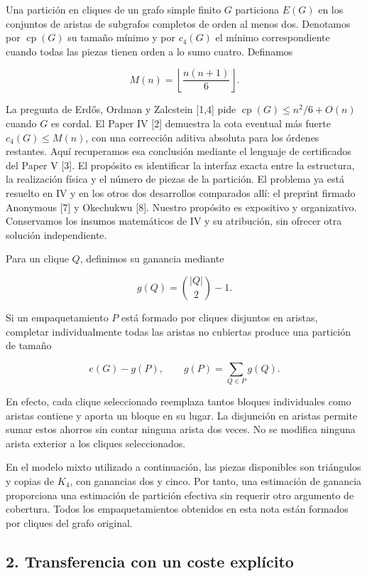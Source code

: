 \documentclass[spanish,11pt,a4paper]{article}
\begin{document}
Una partición en cliques de un grafo simple finito \(G\) particiona
\(E(G)\) en los conjuntos de aristas de subgrafos completos de orden al
menos dos. Denotamos por \(\operatorname{cp}(G)\) su tamaño mínimo y por
\(c_4(G)\) el mínimo correspondiente cuando todas las piezas tienen
orden a lo sumo cuatro. Definamos

\[
M(n)=\left\lfloor\frac{n(n+1)}6\right\rfloor.
\tag{1.1}
\]

La pregunta de Erdős, Ordman y Zalcstein {[}1,4{]} pide
\(\operatorname{cp}(G)\le n^2/6+O(n)\) cuando \(G\) es cordal. El Paper
IV {[}2{]} demuestra la cota eventual más fuerte \(c_4(G)\le M(n)\), con
una corrección aditiva absoluta para los órdenes restantes. Aquí
recuperamos esa conclusión mediante el lenguaje de certificados del
Paper V {[}3{]}. El propósito es identificar la interfaz exacta entre la
estructura, la realización física y el número de piezas de la partición.
El problema ya está resuelto en IV y en los otros dos desarrollos
comparados allí: el preprint firmado Anonymous {[}7{]} y Okechukwu
{[}8{]}. Nuestro propósito es expositivo y organizativo. Conservamos los
insumos matemáticos de IV y su atribución, sin ofrecer otra solución
independiente.

Para un clique \(Q\), definimos su ganancia mediante

\[
g(Q)=\binom{|Q|}{2}-1.
\]

Si un empaquetamiento \(P\) está formado por cliques disjuntos en
aristas, completar individualmente todas las aristas no cubiertas
produce una partición de tamaño

\[
e(G)-g(P),\qquad g(P)=\sum_{Q\in P}g(Q).
\tag{1.2}
\]

En efecto, cada clique seleccionado reemplaza tantos bloques
individuales como aristas contiene y aporta un bloque en su lugar. La
disjunción en aristas permite sumar estos ahorros sin contar ninguna
arista dos veces. No se modifica ninguna arista exterior a los cliques
seleccionados.

En el modelo mixto utilizado a continuación, las piezas disponibles son
triángulos y copias de \(K_4\), con ganancias dos y cinco. Por tanto,
una estimación de ganancia proporciona una estimación de partición
efectiva sin requerir otro argumento de cobertura. Todos los
empaquetamientos obtenidos en esta nota están formados por cliques del
grafo original.

\subsection{2. Transferencia con un coste
explícito}\label{transferencia-con-un-coste-expluxedcito}
\end{document}
